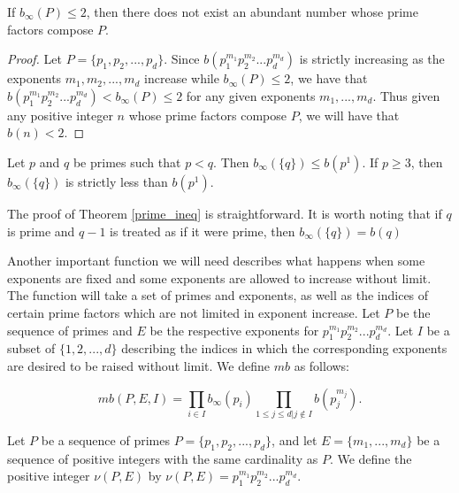 \documentclass[../paper.tex]{article}
\begin{document}
\begin{theorem} \label{b_inf_n!}
If $b_{\infty}(P) \leq 2$, then there does not exist an abundant
number whose prime factors compose $P$.
\end{theorem}

\begin{proof}
Let $P = \{p_1, p_2, ..., p_d\}$.
Since $b(p_1^{m_1} p_2^{m_2} ... p_d^{m_d})$ is strictly increasing as the
exponents $m_1, m_2, ..., m_d$ increase while $b_{\infty}(P) \leq
2$, we have that $b(p_1^{m_1} p_2^{m_2} ... p_d^{m_d}) < 
b_{\infty}(P) \leq 2$ for any given exponents $m_1, ..., m_d$. 
Thus given any positive integer $n$ whose prime factors compose
$P$, we will have that $b(n) < 2$.
\end{proof}

\begin{theorem} \label{prime_ineq}
Let $p$ and $q$ be primes such that $p < q$. Then $b_\infty(\{q\})
\leq b(p^1)$. If $p \geq 3$, then $b_{\infty}(\{q\})$ is strictly
less than $b(p^1)$.
\end{theorem}

The proof of Theorem \ref{prime_ineq} is straightforward. It is worth noting that if $q$ is 
prime and $q - 1$ is treated as if it were prime, then $b_\infty(\{q\}) = b(q)$ 

Another important function we will need describes what happens 
when some exponents are fixed and some exponents are allowed to
increase without limit. 
The function will take a set of primes and exponents,
as well as the indices of certain prime factors which are not
limited in exponent increase. Let $P$ be the sequence of primes 
and $E$ be the respective exponents for 
$p_1^{m_1} p_2^{m_2} ... p_d^{m_d}$. Let $I$ be a subset of
$\{1, 2, ..., d\}$ describing the indices in which the corresponding
exponents are desired to be raised without limit. We define $mb$ as 
follows:

\begin{equation}\label{mb_def}
  mb(P,E,I) = \prod_{i \in I} b_{\infty}(p_i) 
  \prod_{1 \leq j \leq d | j \notin I} b(p_j^{m_j}).
\end{equation}


Let $P$ be a sequence of primes $P = \{p_1, p_2, ..., p_d\}$,
and let $E = \{m_1, ..., m_d\}$ be a sequence of positive integers
with the same cardinality as $P$. We define the positive integer 
$\nu(P,E)$ by $\nu(P,E) = p_1^{m_1} p_2^{m_2} ... p_d^{m_d}$. 
\end{document}
